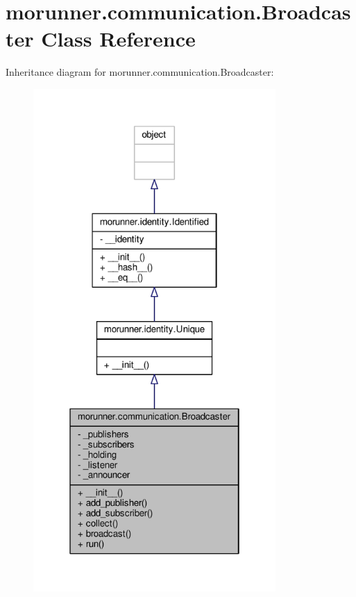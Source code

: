 \hypertarget{classmorunner_1_1communication_1_1Broadcaster}{}\section{morunner.\+communication.\+Broadcaster Class Reference}
\label{classmorunner_1_1communication_1_1Broadcaster}


Inheritance diagram for morunner.\+communication.\+Broadcaster\+:
\nopagebreak
\begin{figure}[H]
\begin{center}
\leavevmode
\includegraphics[width=262pt]{classmorunner_1_1communication_1_1Broadcaster__inherit__graph}
\end{center}
\end{figure}


